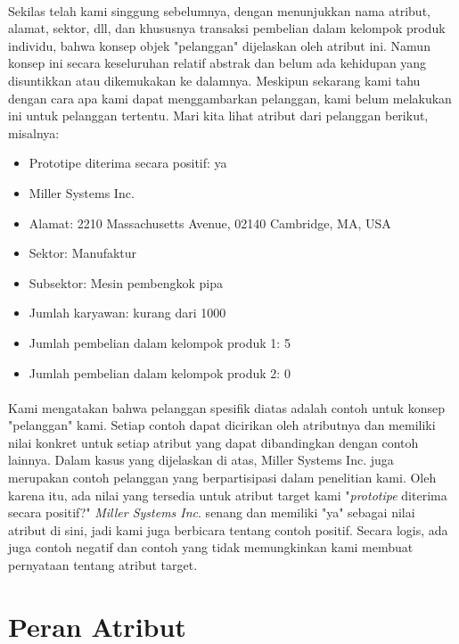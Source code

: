\paragraph{} Sekilas telah kami singgung sebelumnya, dengan menunjukkan nama atribut, alamat, sektor, dll, dan khususnya transaksi pembelian dalam kelompok produk individu, bahwa konsep objek "pelanggan" dijelaskan oleh atribut ini. Namun konsep ini secara keseluruhan relatif abstrak dan belum ada kehidupan yang disuntikkan atau dikemukakan ke dalamnya. Meskipun sekarang kami tahu dengan cara apa kami dapat  menggambarkan pelanggan, kami belum melakukan ini untuk pelanggan tertentu. Mari kita lihat atribut dari pelanggan berikut, misalnya:

\begin{itemize}
    \item Prototipe diterima secara positif: ya
    \item Miller Systems Inc.
\item Alamat: 2210 Massachusetts Avenue, 02140 Cambridge, MA, USA
\item Sektor: Manufaktur
\item Subsektor: Mesin pembengkok pipa
\item Jumlah karyawan: 
kurang dari 1000
\item Jumlah pembelian dalam kelompok produk 1: 5
\item Jumlah pembelian dalam kelompok produk 2: 0 

\end{itemize}

\paragraph{}Kami mengatakan bahwa pelanggan spesifik diatas adalah contoh untuk konsep "pelanggan" kami. Setiap contoh dapat dicirikan oleh atributnya dan memiliki nilai konkret untuk setiap atribut yang dapat dibandingkan dengan contoh lainnya. Dalam kasus yang dijelaskan di atas, Miller Systems Inc. juga merupakan contoh pelanggan yang berpartisipasi dalam penelitian kami. Oleh karena itu, ada nilai yang tersedia untuk atribut target kami "\textit{prototipe} diterima secara positif?" \textit{Miller Systems Inc}. senang dan memiliki "ya" sebagai nilai atribut di sini, jadi kami juga berbicara tentang contoh positif. Secara logis, ada juga contoh negatif dan contoh yang tidak memungkinkan kami membuat pernyataan tentang atribut target.


\section{Peran Atribut}

